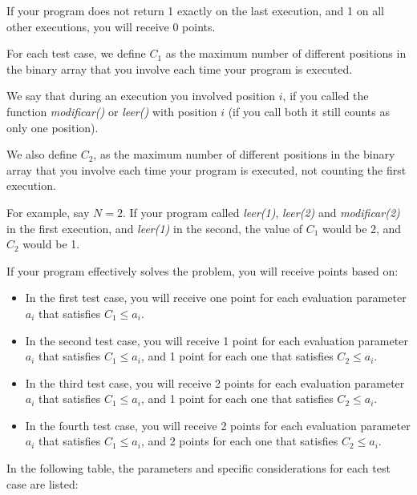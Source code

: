 \documentclass[12pt]{scrartcl}
\begin{document}
        If your program does not return 1 exactly on the last execution, and 1 on all other executions, you will receive 0 points.

        For each test case, we define $C_1$ as the maximum number of different positions in the binary array that you involve each time your program is executed. 
        
        We say that during an execution you involved position $i$, if you called the function {\itshape modificar()} or {\itshape leer()} with position $i$ (if you call both it still counts as only one position). 
        
        We also define $C_2$, as the maximum number of different positions in the binary array that you involve each time your program is executed, not counting the first execution.
        \newline

        For example, say $N = 2$. If your program called \textit{leer(1)}, \textit{leer(2)} and \textit{modificar(2)} in the first execution, and \textit{leer(1)} in the second, the value of $C_1$ would be 2, and $C_2$ would be 1.
        
        If your program effectively solves the problem, you will receive points based on:
        
        
        \begin{itemize}
            \item In the first test case, you will receive one point for each evaluation parameter $a_i$ that satisfies $C_1 \le a_i$.
            \item In the second test case, you will receive 1 point for each evaluation parameter $a_i$ that satisfies $C_1 \le a_i$, and 1 point for each one that satisfies $C_2 \le a_i$.
            \item In the third test case, you will receive 2 points for each evaluation parameter $a_i$ that satisfies $C_1 \le a_i$, and 1 point for each one that satisfies $C_2 \le a_i$.
            \item In the fourth test case, you will receive 2 points for each evaluation parameter $a_i$ that satisfies $C_1 \le a_i$, and 2 points for each one that satisfies $C_2 \le a_i$.
            
        \end{itemize}


        In the following table, the parameters and specific considerations for each test case are listed:
        
        \null
        
\end{document}
